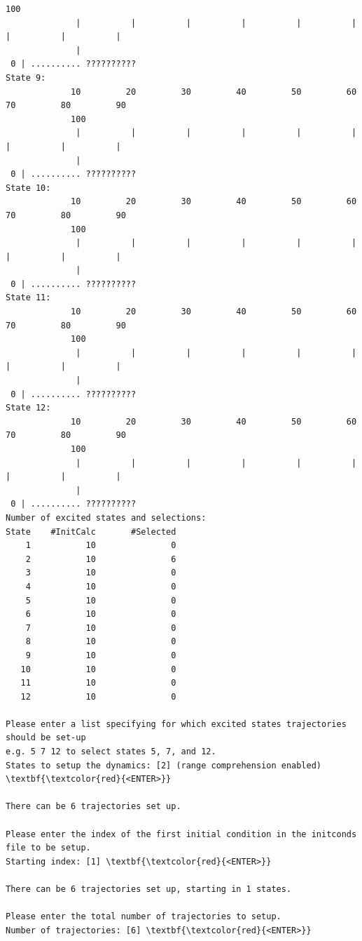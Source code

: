 \documentclass[a4paper,11pt,DIV=15,openany]{scrbook}
\begin{document}
\begin{oframed}
\begin{Verbatim}[commandchars=\\\{\}]
             100
              |          |          |          |          |          |          |          |          |          
              |
 0 | .......... ?????????? 
State 9:
             10         20         30         40         50         60         70         80         90         
             100
              |          |          |          |          |          |          |          |          |          
              |
 0 | .......... ?????????? 
State 10:
             10         20         30         40         50         60         70         80         90         
             100
              |          |          |          |          |          |          |          |          |          
              |
 0 | .......... ?????????? 
State 11:
             10         20         30         40         50         60         70         80         90         
             100
              |          |          |          |          |          |          |          |          |          
              |
 0 | .......... ?????????? 
State 12:
             10         20         30         40         50         60         70         80         90         
             100
              |          |          |          |          |          |          |          |          |          
              |
 0 | .......... ?????????? 
Number of excited states and selections:
State    #InitCalc       #Selected
    1           10               0
    2           10               6
    3           10               0
    4           10               0
    5           10               0
    6           10               0
    7           10               0
    8           10               0
    9           10               0
   10           10               0
   11           10               0
   12           10               0

Please enter a list specifying for which excited states trajectories should be set-up
e.g. 5 7 12 to select states 5, 7, and 12.
States to setup the dynamics: [2] (range comprehension enabled) \textbf{\textcolor{red}{<ENTER>}}

There can be 6 trajectories set up.

Please enter the index of the first initial condition in the initconds file to be setup.
Starting index: [1] \textbf{\textcolor{red}{<ENTER>}}

There can be 6 trajectories set up, starting in 1 states.

Please enter the total number of trajectories to setup.
Number of trajectories: [6] \textbf{\textcolor{red}{<ENTER>}}


\end{Verbatim}
\end{oframed}
\end{document}
